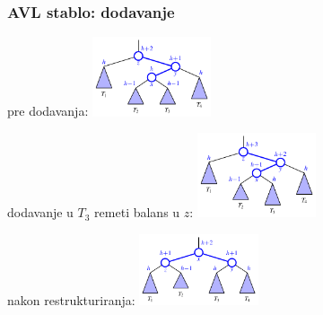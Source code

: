 \documentclass[compress]{beamer}
\begin{document}
\begin{frame}[fragile]
  \frametitle{AVL stablo: dodavanje}
pre dodavanja: \includegraphics[width=3.5cm]{asp-11-pic16a.pdf}

dodavanje u $T_3$ remeti balans u $z$: \includegraphics[width=3.5cm]{asp-11-pic16b.pdf}

nakon restrukturiranja: \includegraphics[width=3.5cm]{asp-11-pic16c.pdf}
\end{frame}
\end{document}
